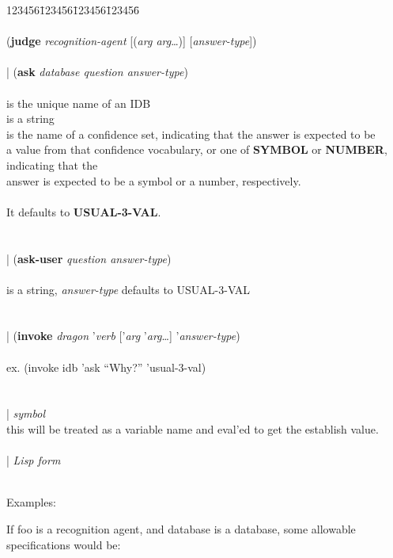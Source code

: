 \begin{tabbing}
123456\=123456\=123456\=123456\= \kill
{}\\
\\
\>\>({\bf judge} {\it recognition-agent\/} [({\it arg arg}\ldots)]
[{\it answer-type}]) \\
\\
\>\>| ({\bf ask} {\it database question answer-type\/}) \\
\\
\>\> is the unique name of an IDB \\
\>\> is a string \\
\>\> is the name of a confidence set, indicating
that the answer is expected to be \\
\>\>\>\>a value from that confidence vocabulary, or one of {\bf
SYMBOL} or {\bf NUMBER}, indicating that the \\
\>\>\>\>answer is expected to be a symbol or a number, respectively.\\
\\
\>\>\>\>It defaults to {\bf USUAL-3-VAL}. \\
\\
\\
\>\>| ({\bf ask-user} {\it question answer-type\/}) \\
\\
\>\> is a string, {\it answer-type} defaults to
USUAL-3-VAL \\
\\
\\
\>\>| ({\bf invoke} {\it dragon} '{\it verb} ['{\it arg} 
'{\it arg}\ldots] '{\it answer-type\/}) \\
\\
\>\>\>ex. (invoke idb 'ask ``Why?'' 'usual-3-val) \\
\\
\\
\>\>| {\it symbol}
\\
\>\>\>this will be treated as a variable name and eval'ed to get the establish value. \\
\\
\>\>| {\it Lisp form} \\
\\
\end{tabbing}
Examples:

	If foo is a recognition agent, and database is a database,
some allowable specifications would be:

